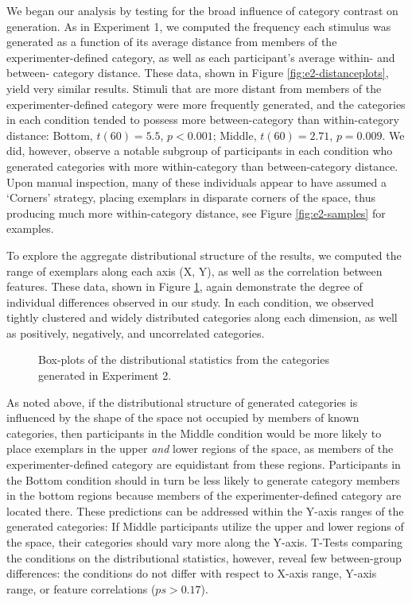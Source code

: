 \documentclass[12pt]{article}
\newcommand\inputpgf[2]{{
\let\pgfimageWithoutPath\pgfimage
\renewcommand{\pgfimage}[2][]{\pgfimageWithoutPath[##1]{#1/##2}}

}}
\begin{document}
\begin{flushleft}
We began our analysis by testing for the broad influence of category contrast on generation. As in Experiment 1, we computed the frequency each stimulus was generated as a function of its average distance from members of the experimenter-defined category, as well as each participant's average within- and between- category distance. These data, shown in Figure \ref{fig:e2-distanceplots}, yield very similar results. Stimuli that are more distant from members of the experimenter-defined category were more frequently generated, and the categories in each condition tended to possess more between-category than within-category distance: Bottom, $t(60) = 5.5$, $p < 0.001$; Middle, $t(60) = 2.71$, $p = 0.009$. We did, however, observe a notable subgroup of participants in each condition who generated categories with more within-category than between-category distance. Upon manual inspection, many of these individuals appear to have assumed a `Corners' strategy, placing exemplars in disparate corners of the space, thus producing much more within-category distance, see Figure \ref{fig:e2-samples} for examples.

To explore the aggregate distributional structure of the results, we computed the range of exemplars along each axis (X, Y), as well as the correlation between features. These data, shown in Figure \ref{fig:e2-statsboxes}, again demonstrate the degree of individual differences observed in our study. In each condition, we observed tightly clustered and widely distributed categories along each dimension, as well as positively, negatively, and uncorrelated categories. 

\begin{figure}
    \begin{center}
    \inputpgf{figs/}{e2-statsboxes.pgf}
    \caption{Box-plots of the distributional statistics from the categories generated in Experiment 2. }
    \label{fig:e2-statsboxes}
    \end{center}
\end{figure}


As noted above, if the distributional structure of generated categories is influenced by the shape of the space not occupied by members of known categories, then participants in the Middle condition would be more likely to place exemplars in the upper {\em and} lower regions of the space, as members of the experimenter-defined category are equidistant from these regions. Participants in the Bottom condition should in turn be less likely to generate category members in the bottom regions because members of the experimenter-defined category are located there. These predictions can be addressed within the Y-axis ranges of the generated categories: If Middle participants utilize the upper and lower regions of the space, their categories should vary more along the Y-axis. T-Tests comparing the conditions on the distributional statistics, however, reveal few between-group differences: the conditions do not differ with respect to X-axis range, Y-axis range, or feature correlations ($ps>0.17$).


\end{flushleft}
\end{document}
